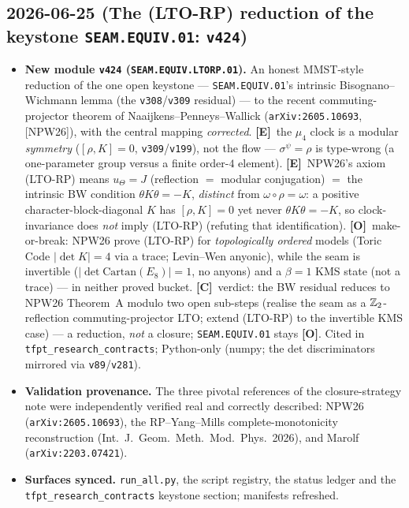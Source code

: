 \documentclass[11pt]{article}
\providecommand{\mE}{\textbf{[E]}}\providecommand{\mC}{\textbf{[C]}}
\providecommand{\mO}{\textbf{[O]}}\providecommand{\mX}{\textbf{[X]}}
\providecommand{\vref}[1]{\texttt{#1}}
\begin{document}
\subsection*{2026-06-25 (The (LTO-RP) reduction of the keystone \texttt{SEAM.EQUIV.01}: \texttt{v424})}
\begin{itemize}
\item \textbf{New module \texttt{v424} (\texttt{SEAM.EQUIV.LTORP.01}).} An honest MMST-style reduction of the one
open keystone --- \texttt{SEAM.EQUIV.01}'s intrinsic Bisognano--Wichmann lemma (the \vref{v308}/\vref{v309}
residual) --- to the recent commuting-projector theorem of Naaijkens--Penneys--Wallick (\texttt{arXiv:2605.10693},
[NPW26]), with the central mapping \emph{corrected}. \mE\ the $\mu_4$ clock is a modular \emph{symmetry}
($[\rho,K]{=}0$, \vref{v309}/\vref{v199}), not the flow --- $\sigma^\psi{=}\rho$ is type-wrong (a one-parameter
group versus a finite order-$4$ element). \mE\ NPW26's axiom (LTO-RP) means $u_\Theta{=}J$ (reflection $=$ modular
conjugation) $=$ the intrinsic BW condition $\theta K\theta{=}-K$, \emph{distinct} from $\omega{\circ}\rho{=}\omega$:
a positive character-block-diagonal $K$ has $[\rho,K]{=}0$ yet never $\theta K\theta{=}-K$, so clock-invariance does
\emph{not} imply (LTO-RP) (refuting that identification). \mO\ make-or-break: NPW26 prove (LTO-RP) for
\emph{topologically ordered} models (Toric Code $|\det K|{=}4$ via a trace; Levin--Wen anyonic), while the seam is
invertible ($|\det\mathrm{Cartan}(E_8)|{=}1$, no anyons) and a $\beta{=}1$ KMS state (not a trace) --- in neither
proved bucket. \mC\ verdict: the BW residual reduces to NPW26 Theorem~A modulo two open sub-steps (realise the seam
as a $\mathbb{Z}_2$-reflection commuting-projector LTO; extend (LTO-RP) to the invertible KMS case) --- a reduction, \emph{not}
a closure; \texttt{SEAM.EQUIV.01} stays \mO. Cited in \texttt{tfpt\_research\_contracts}; Python-only (numpy; the det
discriminators mirrored via \vref{v89}/\vref{v281}).
\item \textbf{Validation provenance.} The three pivotal references of the closure-strategy note were independently
verified real and correctly described: NPW26 (\texttt{arXiv:2605.10693}), the RP--Yang--Mills complete-monotonicity
reconstruction (Int.\ J.\ Geom.\ Meth.\ Mod.\ Phys.\ 2026), and Marolf (\texttt{arXiv:2203.07421}).
\item \textbf{Surfaces synced.} \texttt{run\_all.py}, the script registry, the status ledger and the
\texttt{tfpt\_research\_contracts} keystone section; manifests refreshed.
\end{itemize}
\end{document}
